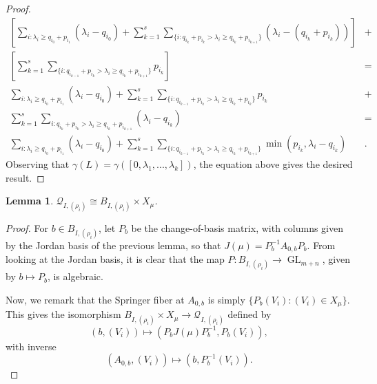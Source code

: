 \documentclass[12pt,psamsfonts]{article}
\DeclareMathOperator{\GL}{GL}
\newtheorem{lemma}[theorem]{Lemma}
\begin{document}
\begin{proof}
\begin{align*}
        \left[\sum_{i : \lambda_i \geq q_{i_0} + p_{i_1}} (\lambda_i - q_{i_0}) + \sum_{k = 1}^s \sum_{\{i : q_{i_k} + p_{i_k} > \lambda_i \geq q_{i_k} + p_{i_{k + 1}}\}} (\lambda_i - (q_{i_k} + p_{i_k}))\right] & + \\
        \left[\sum_{k = 1}^s \sum_{\{i : q_{i_{k - 1}} + p_{i_k} > \lambda_i \geq q_{i_k} + p_{i_{k + 1}}\}} p_{i_k}\right] & = \\
        \sum_{i : \lambda_i \geq q_{i_0} + p_{i_1}} (\lambda_i - q_{i_0}) + \sum_{k = 1}^s \sum_{\{i : q_{i_{k - 1}} + p_{i_k} > \lambda_i \geq q_{i_k} + p_{i_k}\}} p_{i_k} & + \\
        \sum_{k = 1}^s \sum_{i : q_{i_k} + p_{i_k} > \lambda_i \geq q_{i_k} + p_{i_{k + 1}}} (\lambda_i - q_{i_k}) & = \\
        \sum_{i : \lambda_i \geq q_{i_0} + p_{i_1}} (\lambda_i - q_{i_0}) + \sum_{k = 1}^s \sum_{\{i : q_{i_{k - 1}} + p_{i_k} > \lambda_i \geq q_{i_k} + p_{i_{k + 1}}\}} \min(p_{i_k}, \lambda_i - q_{i_k}) & .
    \end{align*}
    Observing that \(\gamma(L) = \gamma([0, \lambda_1, ..., \lambda_k])\), the equation above gives the desired result.
\end{proof}

\begin{lemma}\label{u_i_rho_iso}
    \(\mathcal{Q}_{I, (\rho_i)} \cong B_{I, (\rho_i)} \times X_\mu\).
\end{lemma}
\begin{proof}
    For \(b \in B_{I, (\rho_i)}\), let \(P_b\) be the change-of-basis matrix, with columns given by the Jordan basis of the previous lemma, so that \(J(\mu) = P_b^{-1} A_{0,b} P_b\).
    From looking at the Jordan basis, it is clear that the map \(P : B_{I, (\rho_i)} \to \GL_{m + n}\), given by \(b \mapsto P_b\), is algebraic.
    \par Now, we remark that the Springer fiber at \(A_{0,b}\) is simply \(\{P_b (V_i) : (V_i) \in X_\mu\}\).
    This gives the isomorphism \(B_{I, (\rho_i)} \times X_\mu \to \mathcal{Q}_{I, (\rho_i)}\) defined by
    \[(b, (V_i)) \mapsto (P_b J(\mu) P_b^{-1}, P_b (V_i)),\]
    with inverse
    \[(A_{0,b}, (V_i)) \mapsto (b, P_b^{-1} (V_i)).\]
\end{proof}
\end{document}
